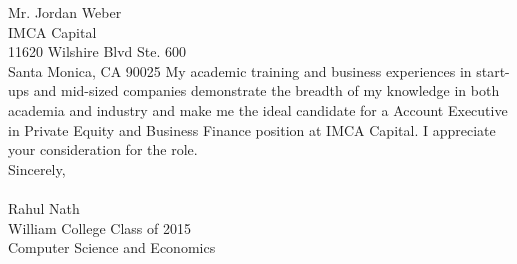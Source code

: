 \documentclass[11pt]{letter} %
\newcommand{\forceindent}{\leavevmode{\parindent=24pt\indent}}
\begin{document}
\begin{letter}{Mr. Jordan Weber \\
IMCA Capital \\
11620 Wilshire Blvd Ste. 600 \\
Santa Monica, CA 90025}
\forceindent My academic training and business experiences in start-ups and mid-sized companies demonstrate the breadth of my knowledge in both academia and industry and make me the ideal candidate for a Account Executive in  Private Equity and Business Finance position at IMCA Capital. I appreciate your consideration for the role. \\ 

Sincerely,\\ \\
Rahul Nath \\
William College Class of 2015  \\
Computer Science and Economics \\




\end{letter}
\end{document}
